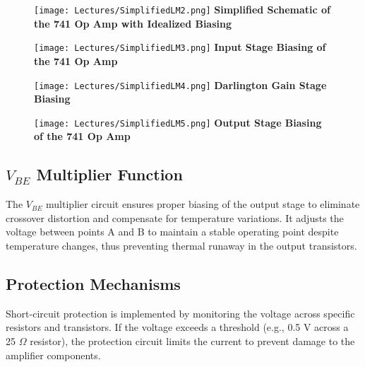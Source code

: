 \documentclass[a4paper,9pt,twoside,openany,twocolumn]{memoir}
\begin{document}
\begin{figure}[H]
    \centering
    \begin{minipage}[t]{0.45\textwidth}
        \centering
        \texttt{[image: Lectures/SimplifiedLM2.png]}
        \small \textbf{Simplified Schematic of the 741 Op Amp with Idealized Biasing}
    \end{minipage}%
    \hfill
    \begin{minipage}[t]{0.45\textwidth}
        \centering
        \texttt{[image: Lectures/SimplifiedLM3.png]}
        \small \textbf{Input Stage Biasing of the 741 Op Amp}
    \end{minipage}
\end{figure}

\begin{figure}[H]
    \centering
    \begin{minipage}[t]{0.45\textwidth}
        \centering
        \texttt{[image: Lectures/SimplifiedLM4.png]}
        \small \textbf{Darlington Gain Stage Biasing}
    \end{minipage}%
    \hfill
    \begin{minipage}[t]{0.45\textwidth}
        \centering
        \texttt{[image: Lectures/SimplifiedLM5.png]}
        \small \textbf{Output Stage Biasing of the 741 Op Amp}
    \end{minipage}
\end{figure}

\subsection{$V_{BE}$ Multiplier Function}
The $V_{BE}$ multiplier circuit ensures proper biasing of the output stage to eliminate crossover distortion and compensate for temperature variations. It adjusts the voltage between points A and B to maintain a stable operating point despite temperature changes, thus preventing thermal runaway in the output transistors.

\subsection{Protection Mechanisms}
Short-circuit protection is implemented by monitoring the voltage across specific resistors and transistors. If the voltage exceeds a threshold (e.g., 0.5 V across a 25 $\Omega$ resistor), the protection circuit limits the current to prevent damage to the amplifier components.
\end{document}
